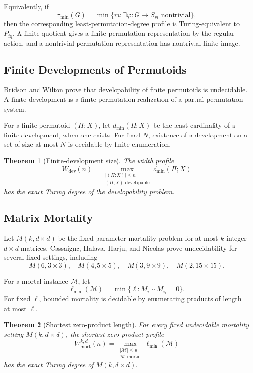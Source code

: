 \documentclass[11pt]{article}
\newtheorem{theorem}{Theorem}[section]
\begin{document}
Equivalently, if
\[
\pi_{\min}(G)=
\min\{m:\exists \varphi:G\to S_m\text{ nontrivial}\},
\]
then the corresponding least-permutation-degree profile is Turing-equivalent to \(P_{\mathrm{fq}}\). A finite quotient gives a finite permutation representation by the regular action, and a nontrivial permutation representation has nontrivial finite image.

\subsection{Finite Developments of Permutoids}

Bridson and Wilton prove that developability of finite permutoids is undecidable. A finite development is a finite permutation realization of a partial permutation system.

For a finite permutoid \((\Pi;X)\), let \(d_{\min}(\Pi;X)\) be the least cardinality of a finite development, when one exists. For fixed \(N\), existence of a development on a set of size at most \(N\) is decidable by finite enumeration.

\begin{theorem}[Finite-development size]
The width profile
\[
W_{\mathrm{dev}}(n)
=
\max_{\substack{|(\Pi;X)|\le n\\(\Pi;X)\text{ developable}}}
d_{\min}(\Pi;X)
\]
has the exact Turing degree of the developability problem.
\end{theorem}

\subsection{Matrix Mortality}

Let \(M(k,d\times d)\) be the fixed-parameter mortality problem for at most \(k\) integer \(d\times d\) matrices. Cassaigne, Halava, Harju, and Nicolas prove undecidability for several fixed settings, including
\[
M(6,3\times3),\quad
M(4,5\times5),\quad
M(3,9\times9),\quad
M(2,15\times15).
\]

For a mortal instance \(\mathcal M\), let
\[
\ell_{\min}(\mathcal M)
=
\min\{\ell:M_{i_1}\cdots M_{i_\ell}=0\}.
\]
For fixed \(\ell\), bounded mortality is decidable by enumerating products of length at most \(\ell\).

\begin{theorem}[Shortest zero-product length]
For every fixed undecidable mortality setting \(M(k,d\times d)\), the shortest zero-product profile
\[
W_{\mathrm{mort}}^{k,d}(n)
=
\max_{\substack{|\mathcal M|\le n\\\mathcal M\text{ mortal}}}
\ell_{\min}(\mathcal M)
\]
has the exact Turing degree of \(M(k,d\times d)\).
\end{theorem}
\end{document}
